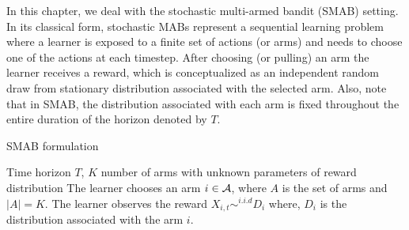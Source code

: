 In this chapter, we deal with the stochastic multi-armed bandit (SMAB) setting. In its classical form, stochastic MABs represent a sequential learning problem where a learner is exposed to a finite set of actions (or arms) and needs to choose one of the actions at each timestep. After choosing (or pulling) an arm the learner receives a reward, which is conceptualized as an independent random draw from stationary distribution associated with the selected arm. Also, note that in SMAB, the distribution associated with each arm is fixed throughout the entire duration of the horizon denoted by $T$.

\begin{algorithm}[!th]
\caption{SMAB formulation}
\label{alg:SMAB}
\begin{algorithmic}
 Time horizon $T$, $K$ number of arms with unknown parameters of reward distribution
\State {}
\State The learner chooses an arm $i\in\mathcal{A}$, where $A$ is the set of arms and $|A|=K$.
\State The learner observes the reward $X_{i,t}\sim^{i.i.d} D_{i}$ where, $D_{i}$ is the distribution associated with the arm $i$. 
\State \EndFor
\end{algorithmic}
\end{algorithm}
	 
